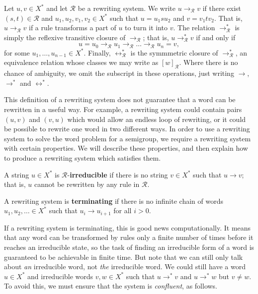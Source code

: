 Let $u, v \in X^*$ and let $\mathscr{R}$ be a rewriting system.
We write $u \to_\mathscr{R} v$ if there exist $(s, t) \in \mathscr{R}$ and
$u_1, u_2, v_1, v_2 \in X^*$ such that $u=u_1su_2$ and $v=v_1tv_2$.
That is, $u \to_\mathscr{R} v$ if a rule transforms a part of $u$ to turn it
into $v$.  The relation $\to_\mathscr{R}^*$ is simply the reflexive transitive
closure of $\to_\mathscr{R}$; that is, $u \to_\mathscr{R}^* v$ if and only if
$$u = u_0 \to_\mathscr{R} u_1 \to_\mathscr{R} \dots \to_\mathscr{R} u_n = v,$$
for some $u_1, \dots, u_{n-1} \in X^*$.
Finally, $\leftrightarrow_\mathscr{R}^*$ is the symmmetric closure of
$\to_\mathscr{R}^*$, an equivalence relation whose classes we may write as
$[w]_\mathscr{R}$.
Where there is no chance of ambiguity, we omit the subscript in these
operations, just writing $\to$, $\to^*$ and $\leftrightarrow^*$.

This definition of a rewriting system does not guarantee that a word can be
rewritten in a useful way.  For example, a rewriting system could contain pairs
$(u,v)$ and $(v,u)$ which would allow an endless loop of rewriting, or it could
be possible to rewrite one word in two different ways.  In order to use a
rewriting system to solve the word problem for a semigroup, we require a
rewriting system with certain properties.  We will describe these properties,
and then explain how to produce a rewriting system which satisfies them.

\begin{definition}
  A string $u \in X^*$ is $\mathscr{R}$-\textbf{irreducible} if there is no
  string $v \in X^*$ such that $u \to v$; that is, $u$ cannot be rewritten by
  any rule in $\mathscr{R}$.  \cite[Def~12.13]{cgt}
\end{definition}

\begin{definition}
  A rewriting system is \textbf{terminating} if there is no infinite chain of
  words $u_1, u_2, \dots \in X^*$ such that $u_i \to u_{i+1}$ for all $i > 0$.
\end{definition}

If a rewriting system is terminating, this is good news computationally.  It
means that any word can be transformed by rules only a finite number of times
before it reaches an irreducible state, so the task of finding an irreducible
form of a word is guaranteed to be achievable in finite time.  But note that we
can still only talk about \textit{an} irreducible word, not \textit{the}
irreducible word.  We could still have a word $u \in X^*$ and irreducible words
$v, w \in X^*$ such that $u \to^* v$ and $u \to^* w$ but $v \neq w$.  To avoid
this, we must ensure that the system is \textit{confluent}, as follows.

